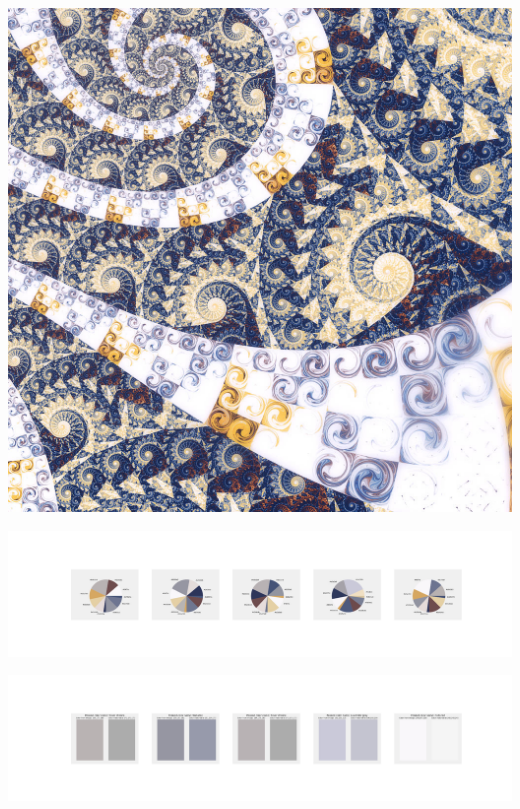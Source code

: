 \documentclass[11pt]{article}
\begin{document}
\begin{landscape}
    \begin{center}
    \includegraphics[width=\textwidth]{./nbimg/file (374).jpg}
    \end{center}

    \begin{center}
    \includegraphics[width=250mm]{./nbimg/pie-305.jpg}
    \end{center}

    \begin{center}
    \includegraphics[width=250mm]{./nbimg/peak-305.jpg}
    \end{center}
    


\end{landscape}
\end{document}
